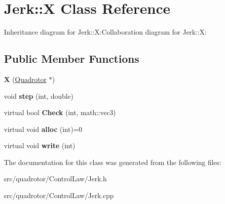 \hypertarget{classJerk_1_1X}{
\section{Jerk::X Class Reference}
\label{classJerk_1_1X}
}
Inheritance diagram for Jerk::X:Collaboration diagram for Jerk::X:\subsection*{Public Member Functions}
\begin{DoxyCompactItemize}
\item 
\hypertarget{classJerk_1_1X_a49b3ee051b79b0266fbb0666fc79fcd8}{
{\bfseries X} (\hyperlink{classQuadrotor}{Quadrotor} $\ast$)}
\label{classJerk_1_1X_a49b3ee051b79b0266fbb0666fc79fcd8}

\item 
\hypertarget{classJerk_1_1X_a89d9df4dbc31111d148f781d485fa298}{
void {\bfseries step} (int, double)}
\label{classJerk_1_1X_a89d9df4dbc31111d148f781d485fa298}

\item 
\hypertarget{classJerk_1_1X_a9dd460bb611e2a8dbc989491db8f791c}{
virtual bool {\bfseries Check} (int, math::vec3)}
\label{classJerk_1_1X_a9dd460bb611e2a8dbc989491db8f791c}

\item 
\hypertarget{classJerk_1_1X_a4535a7664d3b8180395b8886b7514c92}{
virtual void {\bfseries alloc} (int)=0}
\label{classJerk_1_1X_a4535a7664d3b8180395b8886b7514c92}

\item 
\hypertarget{classJerk_1_1X_af5bf90eacad593adefea4b552e88b8b0}{
virtual void {\bfseries write} (int)}
\label{classJerk_1_1X_af5bf90eacad593adefea4b552e88b8b0}

\end{DoxyCompactItemize}


The documentation for this class was generated from the following files:\begin{DoxyCompactItemize}
\item 
src/quadrotor/ControlLaw/Jerk.h\item 
src/quadrotor/ControlLaw/Jerk.cpp\end{DoxyCompactItemize}
